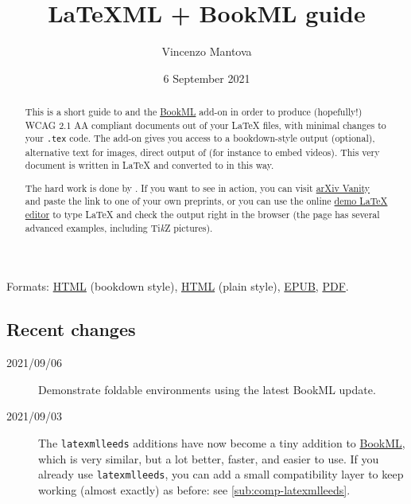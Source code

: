\documentclass[a4paper]{article}
\title{LaTeXML + BookML guide}
\author{Vincenzo Mantova}
\date{6 September 2021}
\def\tikzname{Ti\emph{k}Z}
\theoremstyle{definition}
\begin{document}
\maketitle

\begin{abstract}
  This is a short guide to \LaTeXML{} and the \href{https://vlmantova.github.io/bookml/}{BookML} add-on in order to produce (hopefully!) WCAG 2.1 AA compliant documents out of your \LaTeX{} files, with minimal changes to your \verb|.tex| code. The add-on gives you access to a bookdown-style output (optional), alternative text for images, direct output of \HTML{} (for instance to embed videos). This very document is written in \LaTeX{} and converted to \HTML{} in this way.

  The hard work is done by \LaTeXML{}. If you want to see \LaTeXML{} in action, you can visit \href{https://www.arxiv-vanity.com/}{arXiv Vanity} and paste the link to one of your own preprints, or you can use the online \href{https://latexml.mathweb.org/editor}{demo \LaTeX{} editor} to type \LaTeX{} and check the \HTML{} output right in the browser (the page has several advanced examples, including \tikzname{} pictures).
\end{abstract}

\begin{center}
  Formats: \href{https://minerva.leeds.ac.uk/bbcswebdav/courses/201920_MAPS_MM8863/latexmlleeds/index.html}{HTML} (bookdown style), \href{https://minerva.leeds.ac.uk/bbcswebdav/courses/201920_MAPS_MM8863/latexmlleeds/index.plain.html}{HTML} (plain style), \href{https://minerva.leeds.ac.uk/bbcswebdav/courses/201920_MAPS_MM8863/latexmlleeds/LaTeXML-Leeds.epub}{EPUB}, \href{https://minerva.leeds.ac.uk/bbcswebdav/courses/201920_MAPS_MM8863/latexmlleeds/LaTeXML-Leeds.pdf}{PDF}.
\end{center}

\subsection*{Recent changes}
\begin{description}
  \item[2021/09/06] Demonstrate foldable environments using the latest BookML update.
  \item[2021/09/03] The \texttt{latexmlleeds} additions have now become a tiny addition to \href{https://vlmantova.github.io/bookml/}{BookML}, which is very similar, but a lot better, faster, and easier to use. If you already use \texttt{latexmlleeds}, you can add a small compatibility layer to keep working (almost exactly) as before: see \autoref{sub:comp-latexmlleeds}.
  \end{description}
\end{document}

